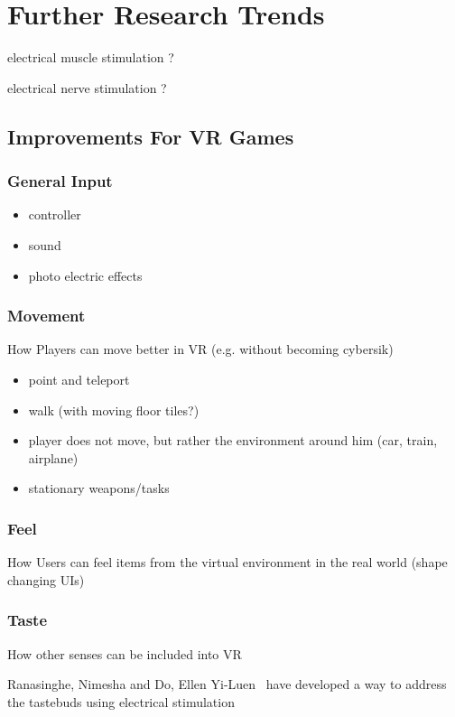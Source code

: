 \section{Further Research Trends}

electrical muscle stimulation ?

electrical nerve stimulation ?

\subsection{Improvements For VR Games}
\subsubsection{General Input}

\begin{itemize}
	\item controller
	\item sound
	\item photo electric effects
\end{itemize}

\subsubsection{Movement}
How Players can move better in VR (e.g. without becoming cybersik)

\begin{itemize}
	\item point and teleport
	\item walk (with moving floor tiles?)
	\item player does not move, but rather the environment around him (car, train, airplane)
	\item stationary weapons/tasks
\end{itemize}

\subsubsection{Feel}
How Users can feel items from the virtual environment in the real world (shape changing UIs)

\subsubsection{Taste}
How other senses can be included into VR

Ranasinghe, Nimesha and Do, Ellen Yi-Luen~\cite{Ranasinghe:2016:VSS:2984751.2985729} have developed a way to address the tastebuds using electrical stimulation

